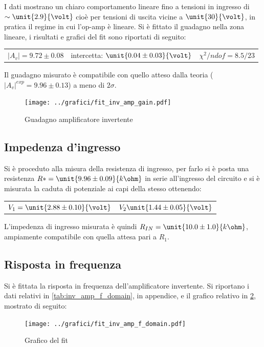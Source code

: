 \documentclass[10pt,a4paper]{article}
\begin{document}
I dati mostrano un chiaro comportamento lineare fino a tensioni in ingresso di $\sim \unit{2.9}{\volt}$ cioè per tensioni di uscita vicine a $\unit{30}{\volt}$, in pratica il regime in cui l'op-amp è lineare. Si è fittato il guadagno nella zona lineare, i risultati e grafici del fit sono riportati di seguito:

\begin{table}[h!]
	\centering
	\begin{tabular}{ccc}
		$|A_v| = 9.72 \pm 0.08$  & intercetta: $\unit{0.04 \pm 0.03}{\volt}$ & $\chi^2/ndof= 8.5 / 23$
	\end{tabular}
\end{table}
Il guadagno misurato è compatibile con quello atteso dalla teoria ($|A_v|^{exp} = 9.96 \pm 0.13$) a meno di $2\sigma$.
\begin{figure}[h!]
	\centering
	\texttt{[image: ../grafici/fit\_inv\_amp\_gain.pdf]}
	\caption{Guadagno amplificatore invertente}
	\label{fig:inv_amp_gain}
\end{figure}
 
\subsection{Impedenza d'ingresso}
Si è proceduto alla misura della resistenza di ingresso, per farlo si è posta una resistenza $R* = \unit{9.96 \pm 0.09}{k\ohm}$ in serie all'ingresso del circuito e si è misurata la caduta di potenziale ai capi della stesso ottenendo:

\begin{table}[h!]
	\centering
	\begin{tabular}{cc}
		$V_1 = \unit{2.88 \pm 0.10}{\volt}$  &  $V_2\unit{1.44 \pm 0.05}{\volt}$
	\end{tabular}
\end{table}

L'impedenza di ingresso misurata è quindi $R_{IN}=\unit{10.0 \pm 1.0}{k\ohm}$, ampiamente compatibile con quella attesa pari a $R_1$.

\subsection{Risposta in frequenza}
Si è fittata la risposta in frequenza dell'amplificatore invertente. Si riportano i dati relativi in \tablename{\ref{tab:inv_amp_f_domain}}, in appendice, e il grafico relativo in \figurename{\ref{fig:invamp}}, mostrato di seguito:

\begin{figure}[h!]
	\centering
	\texttt{[image: ../grafici/fit\_inv\_amp\_f\_domain.pdf]}
	\caption{Grafico del fit }
	\label{fig:invamp}
\end{figure}
\end{document}
